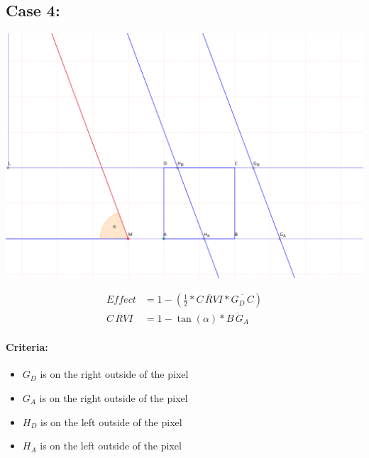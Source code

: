 \documentclass[a4paper,10pt,fleqn]{scrartcl}
\numberwithin{equation}{subsection}
\begin{document}
\subsection{Case 4:}
\begin{minipage}{\textwidth}
\includegraphics[width=\textwidth]{case4}
\end{minipage}
\begin{align}
Effect &= 1 - (\frac{1}{2} * \overline{C\,RVI} * \overline{G_D\,C})\\
\overline{C\,RVI} &=  1 - \tan(\alpha) * \overline{B\,G_A}
\end{align}
%
\paragraph{Criteria:}
\begin{itemize}
 \item $G_D$ is on the right outside of the pixel
 \item $G_A$ is on the right outside of the pixel
 \item $H_D$ is on the left outside of the pixel
 \item $H_A$ is on the left outside of the pixel
\end{itemize}
%
\end{document}
